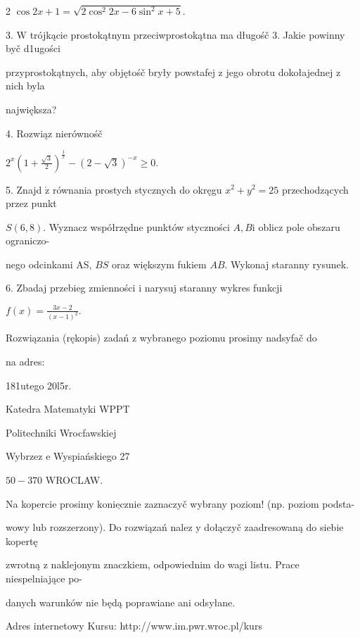 \documentclass[a4paper,12pt]{article}
\begin{document}
2 $\cos 2x+1=\sqrt{2\cos^{2}2x-6\sin^{2}x+5}.$

3. $\mathrm{W}$ trójkącie prostokątnym przeciwprostokątna ma długośč 3. Jakie powinny byč d1ugości

przyprostokątnych, aby objętośč bryły powstafej $\mathrm{z}$ jego obrotu dokołajednej $\mathrm{z}$ nich byla

największa?

4. Rozwiąz nierównośč

$2^{x}(1+\displaystyle \frac{\sqrt{3}}{2})^{\frac{1}{x}}-(2-\sqrt{3})^{-x}\geq 0.$

5. Znajd $\acute{\mathrm{z}}$ równania prostych stycznych do okręgu $x^{2}+y^{2}=25$ przechodzących przez punkt

$S(6,8)$. Wyznacz współrzędne punktów styczności $A, B\mathrm{i}$ oblicz pole obszaru ograniczo-

nego odcinkami AS, $BS$ oraz większym fukiem $AB$. Wykonaj staranny rysunek.

6. Zbadaj przebieg zmienności $\mathrm{i}$ narysuj staranny wykres funkcji

$f(x)=\displaystyle \frac{3x-2}{(x-1)^{2}}.$

Rozwiązania (rękopis) zadań z wybranego poziomu prosimy nadsyfač do

na adres:

181utego 20l5r.

Katedra Matematyki WPPT

Politechniki Wrocfawskiej

Wybrzez $\mathrm{e}$ Wyspiańskiego 27

$50-370$ WROCLAW.

Na kopercie prosimy $\underline{\mathrm{k}\mathrm{o}\mathrm{n}\mathrm{i}\mathrm{e}\mathrm{c}\mathrm{z}\mathrm{n}\mathrm{i}\mathrm{e}}$ zaznaczyč wybrany poziom! (np. poziom podsta-

wowy $\mathrm{l}\mathrm{u}\mathrm{b}$ rozszerzony). Do rozwiązań nalez $\mathrm{y}$ dołączyč zaadresowaną do siebie kopertę

zwrotną $\mathrm{z}$ naklejonym znaczkiem, odpowiednim do wagi listu. Prace niespelniające po-

danych warunków nie będą poprawiane ani odsyłane.

Adres internetowy Kursu: http://www.im.pwr.wroc.pl/kurs
\end{document}
